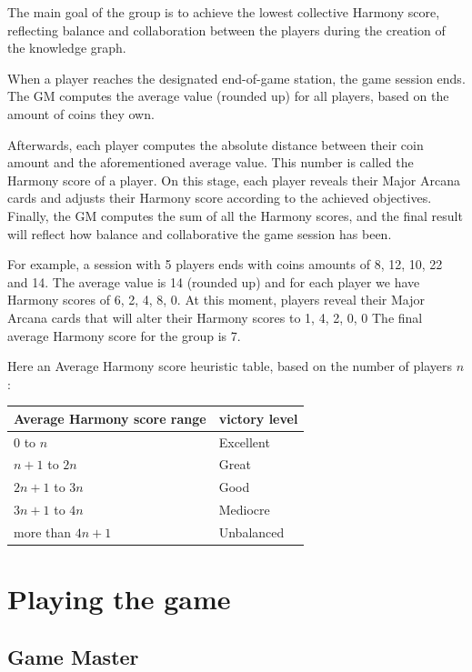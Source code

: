 \documentclass{article}
\begin{document}
\begin{multicols}{2}
The main goal of the group is to achieve the lowest collective Harmony score, reflecting balance and collaboration between the players during the creation of the knowledge graph.

When a player reaches the designated end-of-game station, the game session ends.  The GM computes the average value (rounded up) for all players, based on the amount of coins they own. 

Afterwards, each player computes the absolute distance between their coin amount and the aforementioned average value. This number is called the Harmony score of a player. On this stage, each player reveals their Major Arcana cards and adjusts their Harmony score according to the achieved objectives. Finally, the GM computes the sum of all the Harmony scores, and the final result will reflect how balance and collaborative the game session has been.

For example, a session with 5 players ends with coins amounts of 8, 12, 10, 22 and 14.
The average value is 14 (rounded up) and for each player we have Harmony scores of 6, 2, 4, 8, 0. At this moment, players reveal their Major Arcana cards that will alter their Harmony scores to 1, 4, 2, 0, 0 The final average Harmony score for the group is 7.

Here an Average Harmony score heuristic table, based on the number of players $n$:

\begin{table}[H]
    \centering
    \begin{tabular}{|l|l|}
    \hline
        Average Harmony score range & victory level \\ \hline
        0 to $n$ & Excellent \\ \hline
        $n+1$ to $2n$ & Great \\ \hline
        $2n+1$ to $3n$ & Good \\ \hline
        $3n+1$ to $4n$ & Mediocre \\ \hline
        more than $4n+1$ & Unbalanced \\ \hline
    \end{tabular}
\end{table}


\section{Playing the game}

\subsection{Game Master}


\end{multicols}
\end{document}
